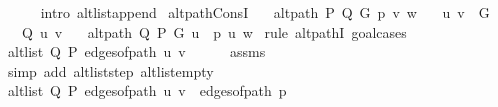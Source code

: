 \begin{isabellebody}
\ \ \ \ \isamarkupfalse%
\ {\isacharparenleft}{\kern0pt}intro\ alt{\isacharunderscore}{\kern0pt}list{\isacharunderscore}{\kern0pt}append{\isacharunderscore}{\kern0pt}{}{\isacharparenright}{\kern0pt}\isanewline
{}\isamarkupfalse%
%
\endisatagproof
{\isafoldproof}%
%
\isadelimproof
\isanewline
%
\endisadelimproof
%
\isadeliminvisible
\isanewline
%
\endisadeliminvisible
%
\isataginvisible
{}\isamarkupfalse%
\ alt{\isacharunderscore}{\kern0pt}path{\isacharunderscore}{\kern0pt}ConsI{\isacharcolon}{\kern0pt}\isanewline
\ \ \ {\isachardoublequoteopen}alt{\isacharunderscore}{\kern0pt}path\ P\ Q\ G\ p\ v\ w{\isachardoublequoteclose}\isanewline
\ \ \ {\isachardoublequoteopen}{\isacharbraceleft}{\kern0pt}u{\isacharcomma}{\kern0pt}\ v{\isacharbraceright}{\kern0pt}\ {\isasymin}\ G{\isachardoublequoteclose}\isanewline
\ \ \ {\isachardoublequoteopen}Q\ {\isacharbraceleft}{\kern0pt}u{\isacharcomma}{\kern0pt}\ v{\isacharbraceright}{\kern0pt}{\isachardoublequoteclose}\isanewline
\ \ \ {\isachardoublequoteopen}alt{\isacharunderscore}{\kern0pt}path\ Q\ P\ G\ {\isacharparenleft}{\kern0pt}u\ {\isacharhash}{\kern0pt}\ p{\isacharparenright}{\kern0pt}\ u\ w{\isachardoublequoteclose}%
\endisataginvisible
{\isafoldinvisible}%
%
\isadeliminvisible
\isanewline
%
\endisadeliminvisible
%
\isadelimproof
%
\endisadelimproof
%
\isatagproof
{}\isamarkupfalse%
\ {\isacharparenleft}{\kern0pt}rule\ alt{\isacharunderscore}{\kern0pt}pathI{\isacharcomma}{\kern0pt}\ goal{\isacharunderscore}{\kern0pt}cases{\isacharparenright}{\kern0pt}\isanewline
\ \ \isamarkupfalse%
\ {}\isanewline
\ \ \isamarkupfalse%
\ {\isachardoublequoteopen}alt{\isacharunderscore}{\kern0pt}list\ Q\ P\ {\isacharparenleft}{\kern0pt}edges{\isacharunderscore}{\kern0pt}of{\isacharunderscore}{\kern0pt}path\ {\isacharbrackleft}{\kern0pt}u{\isacharcomma}{\kern0pt}\ v{\isacharbrackright}{\kern0pt}{\isacharparenright}{\kern0pt}{\isachardoublequoteclose}\isanewline
\ \ \ \ \isamarkupfalse%
\ assms{\isacharparenleft}{\kern0pt}{}{\isacharparenright}{\kern0pt}\isanewline
\ \ \ \ \isamarkupfalse%
\ {\isacharparenleft}{\kern0pt}simp\ add{\isacharcolon}{\kern0pt}\ alt{\isacharunderscore}{\kern0pt}list{\isacharunderscore}{\kern0pt}step\ alt{\isacharunderscore}{\kern0pt}list{\isacharunderscore}{\kern0pt}empty{\isacharparenright}{\kern0pt}\isanewline
\ \ \isamarkupfalse%
\ {\isachardoublequoteopen}alt{\isacharunderscore}{\kern0pt}list\ Q\ P\ {\isacharparenleft}{\kern0pt}edges{\isacharunderscore}{\kern0pt}of{\isacharunderscore}{\kern0pt}path\ {\isacharbrackleft}{\kern0pt}u{\isacharcomma}{\kern0pt}\ v{\isacharbrackright}{\kern0pt}\ {\isacharat}{\kern0pt}\ edges{\isacharunderscore}{\kern0pt}of{\isacharunderscore}{\kern0pt}path\ p{\isacharparenright}{\kern0pt}{\isachardoublequoteclose}\isanewline

\end{isabellebody}
